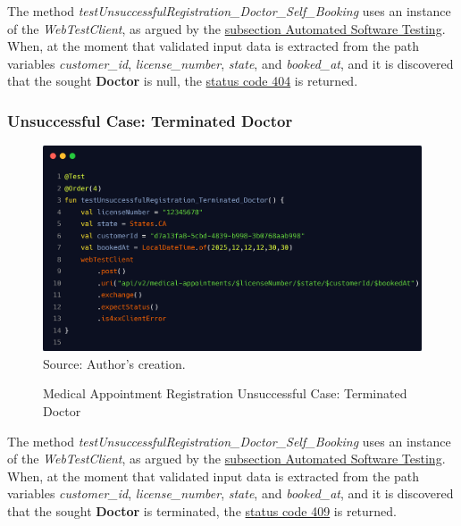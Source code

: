The method \textit{testUnsuccessfulRegistration\_Doctor\_Self\_Booking} uses an instance of the \textit{WebTestClient}, as argued by the \hyperref[subsection:automated_software_testing]{subsection Automated Software Testing}. When, at the moment that validated input data is extracted from the path variables \textit{customer\_id}, \textit{license\_number}, \textit{state}, and \textit{booked\_at}, and it is discovered that the sought \textbf{Doctor} is null, the \hyperref[tab:summary_http_status_codes]{status code 404} is returned.

\subsubsection{Unsuccessful Case: Terminated Doctor}

\begin{figure}[H]
	\centering
	\caption{Medical Appointment Registration Unsuccessful Case: Terminated Doctor}
	\includegraphics[width=1\linewidth]{figures/medical_appointment_registration_integration_test_unsuccessful_case_terminated_doctor.png}
	\label{fig:medical_appointment_registration_integration_test_unsuccessful_case_terminated_doctor}
	\footnotesize Source: Author's creation.
\end{figure}

The method \textit{testUnsuccessfulRegistration\_Doctor\_Self\_Booking} uses an instance of the \textit{WebTestClient}, as argued by the \hyperref[subsection:automated_software_testing]{subsection Automated Software Testing}. When, at the moment that validated input data is extracted from the path variables \textit{customer\_id}, \textit{license\_number}, \textit{state}, and \textit{booked\_at}, and it is discovered that the sought \textbf{Doctor} is terminated, the \hyperref[tab:summary_http_status_codes]{status code 409} is returned.

